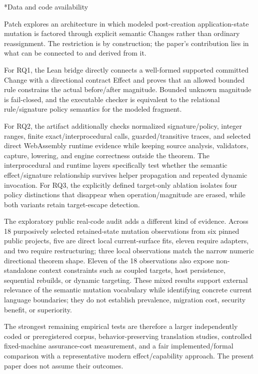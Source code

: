 \long{}{%
Patch explores an architecture in which modeled post-creation application-state mutation is factored through explicit semantic Changes rather than ordinary reassignment. The restriction is by construction; the paper's contribution lies in what can be connected to and derived from it.

For RQ1, the Lean bridge directly connects a well-formed supported committed Change with a directional contract Effect and proves that an allowed bounded rule constrains the actual before/after magnitude. Bounded unknown magnitude is fail-closed, and the executable checker is equivalent to the relational rule/signature policy semantics for the modeled fragment.

For RQ2, the artifact additionally checks normalized signature/policy, integer ranges, finite exact/interprocedural calls, guarded/transitive traces, and selected direct WebAssembly runtime evidence while keeping source analysis, validators, capture, lowering, and engine correctness outside the theorem. The interprocedural and runtime layers specifically test whether the semantic effect/signature relationship survives helper propagation and repeated dynamic invocation. For RQ3, the explicitly defined target-only ablation isolates four policy distinctions that disappear when operation/magnitude are erased, while both variants retain target-escape detection.

The exploratory public real-code audit adds a different kind of evidence. Across 18 purposively selected retained-state mutation observations from six pinned public projects, five are direct local current-surface fits, eleven require adapters, and two require restructuring; three local observations match the narrow numeric directional theorem shape. Eleven of the 18 observations also expose non-standalone context constraints such as coupled targets, host persistence, sequential rebuilds, or dynamic targeting. These mixed results support external relevance of the semantic mutation vocabulary while identifying concrete current language boundaries; they do not establish prevalence, migration cost, security benefit, or superiority.

The strongest remaining empirical tests are therefore a larger independently coded or preregistered corpus, behavior-preserving translation studies, controlled fixed-machine assurance-cost measurement, and a fair implemented/formal comparison with a representative modern effect/capability approach. The present paper does not assume their outcomes.

%
\PatchReplaceDataAvailability
}

